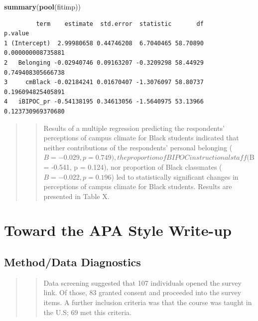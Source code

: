 \documentclass[
  11pt,
]{book}
\newenvironment{Shaded}{\begin{snugshade}}{\end{snugshade}}
\newcommand{\FunctionTok}[1]{\textcolor[rgb]{0.27,0.27,0.27}{\textbf{#1}}}
\newcommand{\NormalTok}[1]{#1}
\begin{document}
\begin{Shaded}
\begin{Highlighting}[]
\FunctionTok{summary}\NormalTok{(}\FunctionTok{pool}\NormalTok{(fitimp))}
\end{Highlighting}
\end{Shaded}

\begin{verbatim}
         term    estimate  std.error  statistic       df           p.value
1 (Intercept)  2.99980658 0.44746208  6.7040465 58.70890 0.000000008735881
2   Belonging -0.02940746 0.09163207 -0.3209298 58.44929 0.749408305666738
3     cmBlack -0.02184241 0.01670407 -1.3076097 58.80737 0.196094825405891
4   iBIPOC_pr -0.54138195 0.34613056 -1.5640975 53.13966 0.123730969370680
\end{verbatim}

\begin{quote}
\begin{quote}
Results of a multiple regression predicting the respondents' perceptions of campus climate for Black students indicated that neither contributions of the respondents' personal belonging (\(B = -0.029, p = 0.749),the proportion of BIPOC instructional staff (\)B = -0.541, p = 0.124), nor proportion of Black classmates (\(B = -0.022, p = 0.196\)) led to statistically significant changes in perceptions of campus climate for Black students. Results are presented in Table X.
\end{quote}
\end{quote}

\hypertarget{toward-the-apa-style-write-up-1}{%
\section{Toward the APA Style Write-up}\label{toward-the-apa-style-write-up-1}}

\hypertarget{methoddata-diagnostics}{%
\subsection{Method/Data Diagnostics}\label{methoddata-diagnostics}}

\begin{quote}
\begin{quote}
Data screening suggested that 107 individuals opened the survey link. Of those, 83 granted consent and proceeded into the survey items. A further inclusion criteria was that the course was taught in the U.S; 69 met this criteria.
\end{quote}
\end{quote}
\end{document}
